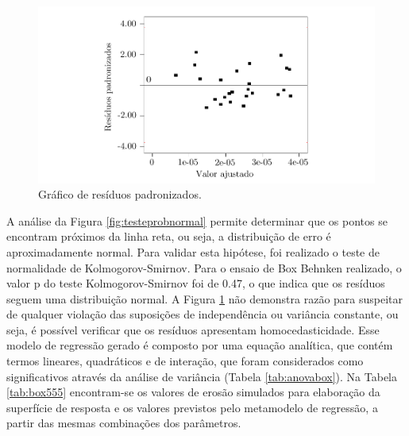 \begin{figure}[H] 
    \centering  
    \includegraphics{Figuras/residuos.pdf}  
    \caption{Gráfico de resíduos padronizados.}  
    \label{fig:residuoshomoedasticidade}  
\end{figure}

A análise da Figura \ref{fig:testeprobnormal} permite determinar que os pontos se encontram próximos da linha reta, ou seja, a distribuição de erro é aproximadamente normal. Para validar esta hipótese, foi realizado o teste de normalidade de Kolmogorov-Smirnov. Para o ensaio de Box Behnken realizado, o valor p do teste Kolmogorov-Smirnov foi de 0.47, o que indica que os resíduos seguem uma distribuição normal. A Figura \ref{fig:residuoshomoedasticidade} não demonstra razão para suspeitar de qualquer violação das suposições de independência ou variância constante, ou seja, é possível verificar que os resíduos apresentam homocedasticidade.
Esse modelo de regressão gerado é composto por uma equação analítica, que contém termos lineares, quadráticos e de interação, que foram considerados como significativos através da análise de variância (Tabela \ref{tab:anovabox}). Na Tabela \ref{tab:box555} encontram-se os valores de erosão simulados para elaboração da superfície de resposta e os valores previstos pelo metamodelo de regressão, a partir das mesmas combinações dos parâmetros.

